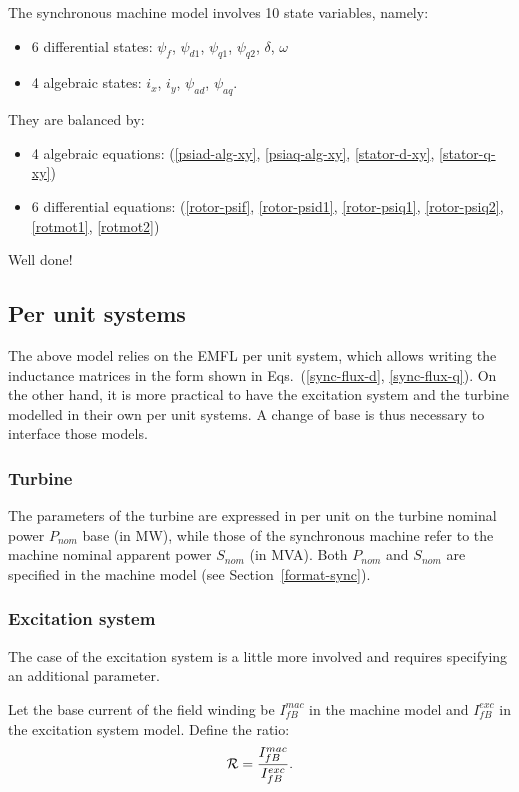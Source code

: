 The synchronous machine model involves 10 state variables, namely:
\begin{itemize}
\item 6 differential states: $\psi_f$, $\psi_{d1}$, $\psi_{q1}$, $\psi_{q2}$, $\delta$, $\omega$
\item 4 algebraic states: $i_x$, $i_y$, $\psi_{ad}$, $\psi_{aq}$.
\end{itemize}

They are balanced by:
\begin{itemize}
\item 4 algebraic equations: (\ref{psiad-alg-xy}, \ref{psiaq-alg-xy}, \ref{stator-d-xy}, \ref{stator-q-xy})
\item 6 differential equations: (\ref{rotor-psif}, \ref{rotor-psid1}, \ref{rotor-psiq1}, \ref{rotor-psiq2}, \ref{rotmot1}, \ref{rotmot2})
\end{itemize}

Well done!

\subsection{Per unit systems}

The above model relies on the EMFL per unit system, which allows writing the inductance matrices in the form shown in Eqs.~(\ref{sync-flux-d}, \ref{sync-flux-q}). On the other hand, it is more practical to have the excitation system and the turbine modelled in their own per unit systems. A change of base is thus necessary to interface those models.

\subsubsection*{Turbine}

The parameters of the turbine are expressed in per unit on the turbine nominal power $P_{nom}$ base (in MW), while those of the synchronous machine refer to the machine nominal apparent power $S_{nom}$ (in MVA). Both $P_{nom}$ and $S_{nom}$ are specified in the machine model (see Section~\ref{format-sync}).

\subsubsection*{Excitation system}

The case of the excitation system is a little more involved and requires specifying an additional parameter.

Let the base current of the field winding be $I_{fB}^{mac}$ in the machine model and $I_{fB}^{exc}$ in the excitation system model. Define the ratio:
\begin{equation}\label{ibratio-def}
{\cal R} = \frac{I_{fB}^{mac}}{I_{fB}^{exc}}.
\end{equation}

